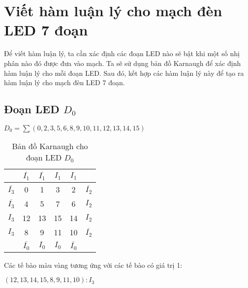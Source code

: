 \section{Viết hàm luận lý cho mạch đèn LED 7 đoạn}

Để viết hàm luận lý, ta cần xác định các đoạn LED nào sẽ bật khi một số nhị phân nào đó được đưa vào mạch. Ta sẽ sử dụng bản đồ Karnaugh để xác định hàm luận lý cho mỗi đoạn LED. Sau đó, kết hợp các hàm luận lý này để tạo ra hàm luận lý cho mạch đèn LED 7 đoạn.

\subsection{Đoạn LED \texorpdfstring{$D_0$}{D0}}

$D_0 = \sum(0,2,3,5,6,8,9,10,11,12,13,14,15)$

\renewcommand{\arraystretch}{1.5} %

\begin{table}[H]
	\centering
	\begin{tabular}{|c|c|c|c|c|c|}
		\hline
		                   & \(\overline{I_1}\)   & \(\overline{I_1}\)   & \(I_1\)              & \(I_1\)              &                    \\
		\hline
		\(\overline{I_3}\) & \cellcolor{yellow}0  & 1                    & \cellcolor{yellow}3  & \cellcolor{yellow}2  & \(\overline{I_2}\) \\
		\hline
		\(\overline{I_3}\) & 4                    & \cellcolor{yellow}5  & 7                    & \cellcolor{yellow}6  & \(I_2\)            \\
		\hline
		\(I_3\)            & \cellcolor{yellow}12 & \cellcolor{yellow}13 & \cellcolor{yellow}15 & \cellcolor{yellow}14 & \(I_2\)            \\
		\hline
		\(I_3\)            & \cellcolor{yellow}8  & \cellcolor{yellow}9  & \cellcolor{yellow}11 & \cellcolor{yellow}10 & \(\overline{I_2}\) \\
		\hline
		                   & \(\overline{I_0}\)   & \(I_0\)              & \(I_0\)              & \(\overline{I_0}\)   &                    \\
		\hline
	\end{tabular}
	\caption*{Bản đồ Karnaugh cho đoạn LED \(D_0\)}
\end{table}

Các tế bào màu vàng tương ứng với các tế bào có giá trị 1:

\((12,13,14,15,8,9,11,10): I_3\)

